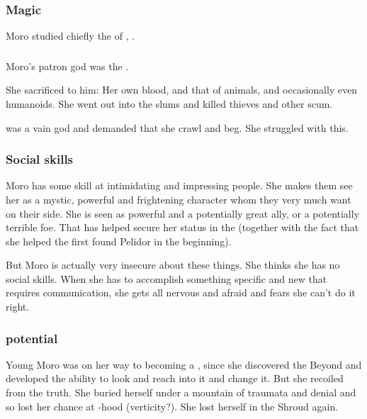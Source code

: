 \subsubsection{Magic}
Moro \Cornel studied chiefly the \arcanum of \Nasshikerr, . 





\subsubsection{\Nasshikerr}
Moro's patron god was the \Taortha {}. 

She sacrificed to him: 
Her own blood, and that of animals, and occasionally even humanoids. 
She went out into the slums and killed thieves and other scum. 

\Nasshikerr{} was a vain god and demanded that she crawl and beg. 
She struggled with this. 





\subsubsection{Social skills}
Moro has some skill at intimidating and impressing people. 
She makes them see her as a mystic, powerful and frightening character whom they very much want on their side. 
She is seen as powerful and a potentially great ally, or a potentially terrible foe. 
That has helped secure her status in the \ishrah{} (together with the fact that she helped the first \rayuths found Pelidor in the beginning). 

But Moro is actually very insecure about these things. 
She thinks she has no social skills. 
When she has to accomplish something specific and new that requires communication, she gets all nervous and afraid and fears she can't do it right. 





\subsubsection{\Vertex{} potential}
Young Moro was on her way to becoming a \vertex, since she discovered the Beyond and developed the ability to look and reach into it and change it. 
But she recoiled from the truth. 
She buried herself under a mountain of traumata and denial and so lost her chance at \vertex-hood (verticity?). 
She lost herself in the Shroud again. 

